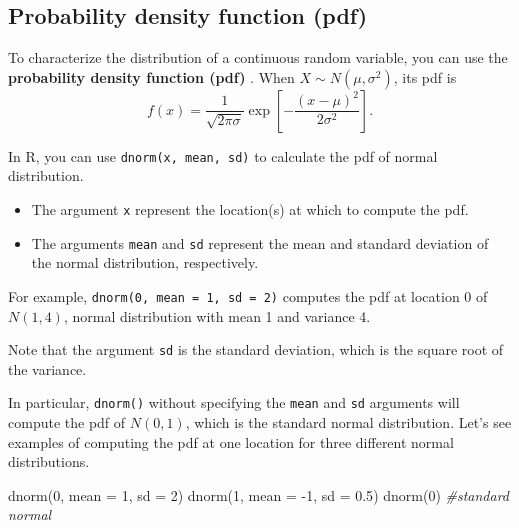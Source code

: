 \documentclass[
]{book}
\newenvironment{Shaded}{\begin{snugshade}}{\end{snugshade}}
\newcommand{\AttributeTok}[1]{\textcolor[rgb]{0.77,0.63,0.00}{#1}}
\newcommand{\CommentTok}[1]{\textcolor[rgb]{0.56,0.35,0.01}{\textit{#1}}}
\newcommand{\DecValTok}[1]{\textcolor[rgb]{0.00,0.00,0.81}{#1}}
\newcommand{\FloatTok}[1]{\textcolor[rgb]{0.00,0.00,0.81}{#1}}
\newcommand{\FunctionTok}[1]{\textcolor[rgb]{0.00,0.00,0.00}{#1}}
\newcommand{\NormalTok}[1]{#1}
\newcommand{\SpecialCharTok}[1]{\textcolor[rgb]{0.00,0.00,0.00}{#1}}
\newenvironment{infobox}[1]
  {
  \begin{itemize}
  \renewcommand{\labelitemi}{
    \raisebox{-.7\height}[0pt][0pt]{
      {\setkeys{Gin}{width=3em,keepaspectratio}
        \texttt{[image: pics/\#1]}}
    }
  }
  \setlength{\fboxsep}{1em}
  \begin{blackbox}
  \item
  }
  {
  \end{blackbox}
  \end{itemize}
  }
\newenvironment{blackbox}{
  \definecolor{shadecolor}{rgb}{0, 0, 0}  %
  \color{white}
  \begin{shaded}}
 {\end{shaded}}
\begin{document}
\hypertarget{pdf}{%
\subsection{Probability density function (pdf)}\label{pdf}}

To characterize the distribution of a continuous random variable, you can use the \textbf{probability density function (pdf)} . When \(X\sim N(\mu,\sigma^2)\), its pdf is
\[f(x) = \frac{1}{\sqrt{2\pi \sigma}}\exp\left[-\frac{(x-\mu)^2}{2\sigma^2}\right].\]

In R, you can use \texttt{dnorm(x,\ mean,\ sd)} to calculate the pdf of normal distribution.

\begin{itemize}
\item
  The argument \texttt{x} represent the location(s) at which to compute the pdf.
\item
  The arguments \texttt{mean} and \texttt{sd} represent the mean and standard deviation of the normal distribution, respectively.
\end{itemize}

For example, \texttt{dnorm(0,\ mean\ =\ 1,\ sd\ =\ 2)} computes the pdf at location 0 of \(N(1, 4)\), normal distribution with mean 1 and variance 4.

\begin{infobox}{caution}
Note that the argument \texttt{sd} is the standard deviation, which is the square root of the variance.

\end{infobox}

In particular, \texttt{dnorm()} without specifying the \texttt{mean} and \texttt{sd} arguments will compute the pdf of \(N(0,1)\), which is the standard normal distribution. Let's see examples of computing the pdf at one location for three different normal distributions.

\begin{Shaded}
\begin{Highlighting}[]
\FunctionTok{dnorm}\NormalTok{(}\DecValTok{0}\NormalTok{, }\AttributeTok{mean =} \DecValTok{1}\NormalTok{, }\AttributeTok{sd =} \DecValTok{2}\NormalTok{)}
\FunctionTok{dnorm}\NormalTok{(}\DecValTok{1}\NormalTok{, }\AttributeTok{mean =} \SpecialCharTok{{-}}\DecValTok{1}\NormalTok{, }\AttributeTok{sd =} \FloatTok{0.5}\NormalTok{)}
\FunctionTok{dnorm}\NormalTok{(}\DecValTok{0}\NormalTok{) }\CommentTok{\#standard normal}
\end{Highlighting}
\end{Shaded}
\end{document}
